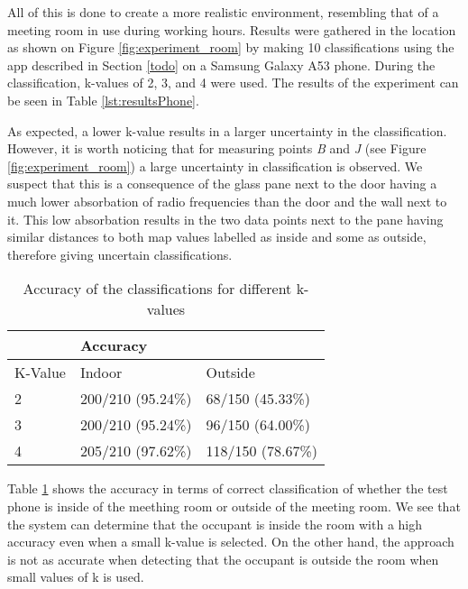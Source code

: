 All of this is done to create a more realistic environment, resembling that of a meeting room in use during working hours. 
Results were gathered in the location as shown on Figure \ref{fig:experiment_room} by making 10 classifications using the app described in Section \ref{todo}  on a Samsung Galaxy A53 phone.
During the classification, k-values of 2, 3, and 4 were used. 
The results of the experiment can be seen in Table \ref{lst:resultsPhone}.

As expected, a lower k-value results in a larger uncertainty in the classification.
However, it is worth noticing that for measuring points \textit{B} and \textit{J}  (see Figure \ref{fig:experiment_room}) a large uncertainty in classification is observed.  
We suspect that this is a consequence of the glass pane next to the door having a much lower absorbation of radio frequencies than the door and the wall next to it. 
This low absorbation results in the two data points next to the pane having similar distances to both map values labelled as inside and some as outside, therefore giving uncertain classifications.

\begin{table}[H]
    \centering
    \begin{tabular}{|l|ll|}
    \hline
            & \multicolumn{2}{l|}{Accuracy}                      \\ \hline
    K-Value & \multicolumn{1}{l|}{Indoor}          & Outside      \\ \hline
    2       & \multicolumn{1}{l|}{200/210 (95.24\%)} & 68/150 (45.33\%) \\ \hline
    3       & \multicolumn{1}{l|}{200/210 (95.24\%)} & 96/150 (64.00\%) \\ \hline
    4       & \multicolumn{1}{l|}{205/210 (97.62\%)} & 118/150 (78.67\%) \\ \hline   
    \end{tabular}
    \caption{Accuracy of the classifications for different k-values}
    \label{lst:resultsPhone_precision}
\end{table}

Table \ref{lst:resultsPhone_precision} shows the accuracy in terms of correct classification of whether the test phone is inside of the meething room or outside of the meeting room.
We see that the system can determine that the occupant is inside the room with a high accuracy even when a small k-value is selected.
On the other hand, the approach is not as accurate when detecting that the occupant is outside the room when small values of k is used.  